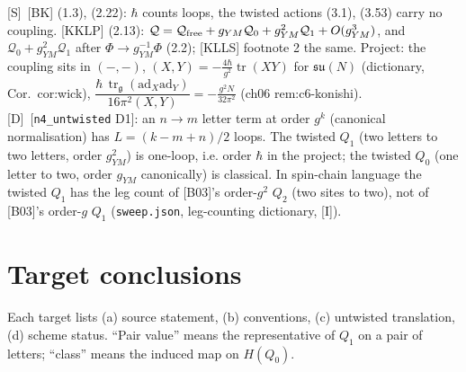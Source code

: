 \documentclass[11pt]{article}
\theoremstyle{definition}
\newcommand{\tr}{\operatorname{tr}}
\newcommand{\Sl}{\textup{[S]}}
\newcommand{\Dl}{\textup{[D]}}
\newcommand{\Il}{\textup{[I]}}
\newcommand{\unit}{\dfrac{\hbar\,\tr_{\mathfrak g}(\mathrm{ad}_X\mathrm{ad}_Y)}{16\pi^2(X,Y)}}
\begin{document}
\Sl\ [BK] (1.3), (2.22): $\hbar$ counts loops, the twisted actions (3.1), (3.53) carry no coupling. [KKLP] (2.13): $\mathcal Q=\mathcal Q_{\rm free}+g_{YM}\mathcal Q_0+g_{YM}^2\mathcal Q_1+O(g_{YM}^3)$, and $\mathcal Q_0+g_{YM}^2\mathcal Q_1$ after $\Phi\to g_{YM}^{-1}\Phi$ (2.2); [KLLS] footnote 2 the same. Project: the coupling sits in $(-,-)$, $(X,Y)=-\tfrac{4\hbar}{g^2}\tr(XY)$ for $\mathfrak{su}(N)$ (dictionary, Cor.~cor:wick), $\unit=-\tfrac{g^2N}{32\pi^2}$ (ch06 rem:c6-konishi). \Dl\ [\texttt{n4\_untwisted} D1]: an $n\to m$ letter term at order $g^k$ (canonical normalisation) has $L=(k-m+n)/2$ loops. The twisted $Q_1$ (two letters to two letters, order $g_{YM}^2$) is one-loop, i.e. order $\hbar$ in the project; the twisted $Q_0$ (one letter to two, order $g_{YM}$ canonically) is classical. In spin-chain language the twisted $Q_1$ has the leg count of [B03]'s order-$g^2$ $Q_2$ (two sites to two), not of [B03]'s order-$g$ $Q_1$ (\texttt{sweep.json}, leg-counting dictionary, \Il).

\section{Target conclusions}

Each target lists (a) source statement, (b) conventions, (c) untwisted translation, (d) scheme status. ``Pair value'' means the representative of $Q_1$ on a pair of letters; ``class'' means the induced map on $H(Q_0)$.
\end{document}

